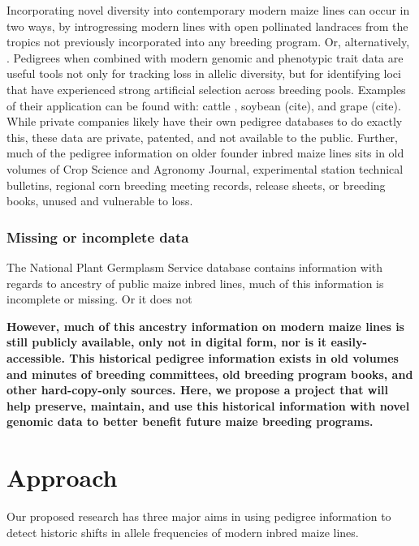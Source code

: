 \documentclass[12pt]{article}
\begin{document}
Incorporating novel diversity into contemporary modern maize lines can occur in two ways, by introgressing modern lines with open pollinated landraces from the tropics not previously incorporated into any breeding program. Or, alternatively, 
%
%
. Pedigrees when combined with modern genomic and phenotypic trait data are useful tools not only for tracking loss in allelic diversity, but for identifying loci that have experienced strong artificial selection across breeding pools. Examples of their application can be found with: cattle \citep{Decker:2012kd}, soybean (cite), and grape (cite). 
While private companies likely have their own pedigree databases to do exactly this, these data are private, patented, and not available to the public. 
Further, much of the pedigree information on older founder inbred maize lines sits in old volumes of Crop Science and Agronomy Journal, experimental station technical bulletins, regional corn breeding meeting records, release sheets, or breeding books, unused and vulnerable to loss. %
%
%
\subsubsection*{Missing or incomplete data}
\par The National Plant Germplasm Service database contains information with regards to ancestry of public maize inbred lines, much of this information is incomplete or missing. Or it does not 

\textbf{However, much of this ancestry information on modern maize lines  is still publicly available, only not in digital form, nor is it easily-accessible. This historical pedigree information exists in old volumes and minutes of breeding committees, old breeding program books, and other hard-copy-only sources. Here, we propose a project that will help preserve, maintain, and use this historical information with novel genomic data to better benefit future maize breeding programs.} 

\section*{Approach}
\label{sec:approach}
Our proposed research has three major aims in using pedigree information to detect historic shifts in allele frequencies of modern inbred maize lines.
\end{document}

